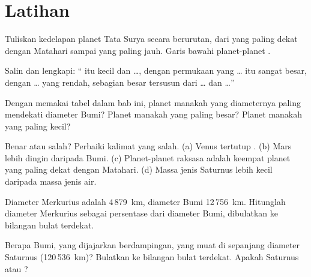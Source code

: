 \section{Latihan}

\begin{exercise}[$\star$]\label{exo:g6:earth-a-planet:1}
Tuliskan kedelapan planet Tata Surya secara berurutan, dari yang paling
dekat dengan Matahari sampai yang paling jauh. Garis bawahi planet-planet
.
\end{exercise}

\begin{exercise}[$\star$]\label{exo:g6:earth-a-planet:2}
Salin dan lengkapi: `` itu kecil dan \ldots, dengan permukaan
yang \ldots{}  itu sangat besar, dengan \ldots{} yang rendah,
sebagian besar tersusun dari \ldots{} dan \ldots{}''
\end{exercise}

\begin{exercise}[$\star$]\label{exo:g6:earth-a-planet:3}
Dengan memakai tabel dalam bab ini, planet manakah yang diameternya paling
mendekati diameter Bumi? Planet manakah yang paling besar? Planet manakah
yang paling kecil?
\end{exercise}

\begin{exercise}[$\star$]\label{exo:g6:earth-a-planet:4}
Benar atau salah? Perbaiki kalimat yang salah.
(a) Venus tertutup .
(b) Mars lebih dingin daripada Bumi.
(c) Planet-planet raksasa adalah keempat planet yang paling dekat dengan Matahari.
(d) Massa jenis Saturnus lebih kecil daripada massa jenis air.
\end{exercise}

\begin{exercise}[$\star\star$]\label{exo:g6:earth-a-planet:5}
Diameter Merkurius adalah 4\,879~km, diameter Bumi 12\,756~km. Hitunglah
diameter Merkurius sebagai persentase dari diameter Bumi, dibulatkan ke
bilangan bulat terdekat.
\end{exercise}

\begin{exercise}[$\star\star$]\label{exo:g6:earth-a-planet:6}
Berapa Bumi, yang dijajarkan berdampingan, yang muat di sepanjang diameter
Saturnus (120\,536~km)? Bulatkan ke bilangan bulat terdekat. Apakah
Saturnus  atau ?
\end{exercise}

